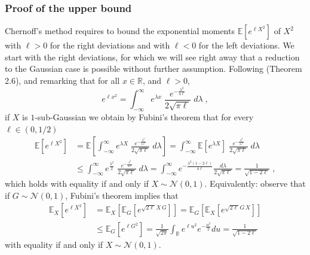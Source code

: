 \documentclass{ps}
\def\R{\mathbb{R}}
\newcommand{\E}{\mathbb{E}}
\newcommand{\1}{\mathbbm{1}}
\theoremstyle{plain}
\begin{document}
\subsubsection{Proof of the upper bound}\label{subsec:UB}
Chernoff's method requires to bound the exponential moments $\E\left[e^{\ell X^2}\right]$ of $X^2$ with $\ell>0$ for the right deviations and with $\ell<0$ for the left deviations. 
We start with the right deviations, for which we will see right away that a reduction to the Gaussian case is possible without further assumption. Following \cite{wainwright_2019} (Theorem 2.6), and remarking that for all $x\in\R$, and $\ell>0$,  \[e^{\ell x^2} = \int_{-\infty}^{\infty} e^{\lambda x}  \;\frac{e^{-\frac{\lambda^2}{4\ell}}}{2\sqrt{\pi\ell}} \;d\lambda\;,\]
if $X$ is $1$-sub-Gaussian we obtain by Fubini's theorem that for  every $\ell\in(0,1/2)$
\begin{align*}
	\E\left[e^{\ell X^2}\right]&=\E\left[ \int_{-\infty}^{\infty}  e^{\lambda X}  \;\frac{e^{-\frac{\lambda^2}{4\ell}}}{2\sqrt{\pi\ell}} \;d\lambda\right]	=\int_{-\infty}^{\infty}\E\left[  e^{\lambda X} \right]\;\frac{e^{-\frac{\lambda^2}{4\ell}}}{2\sqrt{\pi\ell}} \;d\lambda \\
& \leq  \int_{-\infty}^{\infty} e^{\frac{\lambda^2}{2}} \;\frac{e^{-\frac{\lambda^2}{4\ell}}}{2\sqrt{\pi\ell}} \;d\lambda
= \int_{-\infty}^{\infty}e^{-\frac{\lambda^2(1-2\ell)}{4\ell}} \frac{d\lambda}{2\sqrt{\pi\ell}} = \frac{1}{\sqrt{1-2\ell}}\;,
\end{align*}
which holds with equality if and only if $X\sim\mathcal{N}(0,1)$.
Equivalently: observe that if $G\sim\mathcal{N}(0,1)$, Fubini's theorem implies that
\begin{align}
	\E_X\left[e^{\ell X^2}\right] & = \E_X\left[ \E_G\left[ e^{\sqrt{2\ell}X \,G}\right] \right] =  \E_G\left[ \E_X\left[ e^{\sqrt{2\ell}G \,X}\right] \right]  \nonumber\\
	&\leq \E_G\left[ e^{\ell G^2 }\right] = \frac{1}{\sqrt{2\pi}} \int_\R e^{\ell u^2} e^{-\frac{u^2}{2}}du %
 = \frac{1}{\sqrt{1-2\ell}} \label{eq:gaussianTrick}
\end{align}
with equality if and only if $X\sim\mathcal{N}(0,1)$.
\end{document}
